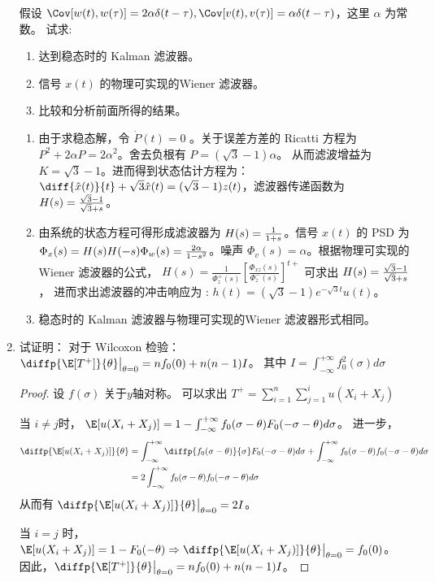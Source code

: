 \documentclass{article}
\begin{document}
\begin{enumerate}
假设 $ \Cov[w(t), w(\tau)] = 2 \alpha \delta(t - \tau), \Cov[v(t), v(\tau) ] = \alpha \delta(t - \tau) $，这里 $ \alpha $ 为常数。
试求:
\begin{enumerate}
\item 达到稳态时的 Kalman 滤波器。
\item 信号 $x(t) $ 的物理可实现的Wiener 滤波器。
\item 比较和分析前面所得的结果。
\end{enumerate}
\begin{solution}\mbox{}
\begin{enumerate}
\item 由于求稳态解，令 $ \dot P(t) = 0 $ 。关于误差方差的 Ricatti 方程为 $ P^2 + 2 \alpha P = 2 \alpha^2 $。舍去负根有 
$ P = (\sqrt{3} - 1) \alpha$。 从而滤波增益为 $ K = \sqrt{3} - 1 $。进而得到状态估计方程为：
$\diff{\hat{x}(t)}{t} + \sqrt{3} \hat{x}(t) = (\sqrt{3} - 1) z(t)$，滤波器传递函数为  $H(s) = { \sqrt{3} - 1 \over \sqrt{3} + s } $。
\item 由系统的状态方程可得形成滤波器为 $ H(s) = { 1 \over 1 + s} $。信号 $x(t)$ 的 PSD 为 $\Phi_x(s) =  H(s) H(-s) \Phi_w(s) = { 2\alpha \over 1 - s^2 }$。噪声 $ \Phi_v(s) = \alpha $。根据物理可实现的 Wiener 滤波器的公式，
$ H(s) = \frac{1}{\Phi_z^+(s)}\left[\frac{\Phi_{xz}(s)}{\Phi_z^{-}(s)}\right]^{t+}$ 可求出 $ H(s) ={  \sqrt{3} - 1 \over \sqrt{3} + s }$， 进而求出滤波器的冲击响应为  : $ h(t) = (\sqrt{3} - 1) e^{-\sqrt{3} t} u(t) $。
\item 稳态时的 Kalman 滤波器与物理可实现的Wiener 滤波器形式相同。
\end{enumerate}
\end{solution}
\item 试证明：
对于 Wilcoxon 检验： $ \diffp{\E[T^+]}{\theta} \big\vert_{\theta = 0} = n f_0(0) + n(n-1) I $。
其中 $ I = \int_{-\infty}^{+\infty} f_0^2(\sigma) d\sigma $
\begin{proof}
设 $ f(\sigma)$ 关于$y$轴对称。
可以求出 $ T^+  = \sum_{ i = 1 }^n \sum_{ j = 1}^i u(X_i + X_j) $

当 $ i \neq j $时，  $ \E[u(X_i + X_j) ] = 1 - \int_{ -\infty }^{ +\infty} f_0(\sigma - \theta) F_0( - \sigma - \theta ) d\sigma $。
进一步，
\begin{align*}
\diffp{\E[u(X_i + X_j) ] }{\theta} & = \int_{ -\infty }^{ +\infty} \diffp{f_0(\sigma - \theta)}{\sigma} F_0( - \sigma - \theta ) d\sigma 
+ \int_{ -\infty }^{ +\infty} f_0(\sigma - \theta) f_0( - \sigma - \theta ) d\sigma \\
& = 2\int_{ -\infty }^{ +\infty} f_0(\sigma - \theta) f_0( - \sigma - \theta ) d\sigma  
\end{align*}
从而有 $ \diffp{\E[u(X_i + X_j) ] }{\theta}\big\vert_{\theta = 0} = 2I $。

当 $ i = j $ 时， $ \E[u(X_i + X_j)] = 1 - F_0(-\theta) \Rightarrow  \diffp{\E[u(X_i + X_j) ] }{\theta}\big\vert_{\theta = 0} = f_0(0) $。
因此，$ \diffp{\E[T^+]}{\theta} \big\vert_{\theta = 0} = n f_0(0) + n(n-1) I $。
\end{proof}
\end{enumerate}
\end{document}
